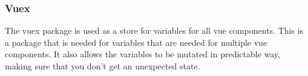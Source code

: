 \subsubsection{Vuex}
The vuex package is used as a store for variables for all vue components. This is a package that is needed for variables that are needed for multiple vue components. It also allows the variables to be mutated in predictable way, making sure that you don't get an unexpected state.
